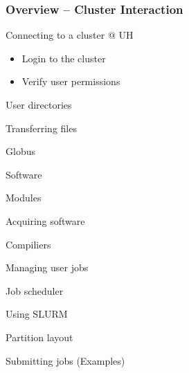 \documentclass[t,hyperref={pdfpagelabels=false}]{beamer}
\newcommand{\semitransp}[2][35]{\color{fg!#1}#2}
\begin{document}
\begin{frame}
	\frametitle{Overview -- Cluster Interaction}
	\begin{itemize}
		\item{Connecting to a cluster @ UH}
			\begin{itemize}
			\item Login to the cluster
			\item Verify user permissions
			\end{itemize}
    {\semitransp[25]{\item User directories
		\item Transferring files
		\begin{itemize}{\semitransp[25]{
			\item Globus
		}}\end{itemize}
		\item Software
		\begin{itemize}{\semitransp[25]{
			\item Modules
			\item Acquiring software
			\item Compiliers
			}}
		\end{itemize}
		\item Managing user jobs
		\begin{itemize}{\semitransp[25]{
			\item Job scheduler
			\item Using SLURM
			\item Partition layout			
			\item Submitting jobs (Examples)
			}}
		\end{itemize}			
		}}
	\end{itemize}
\end{frame}
\end{document}
